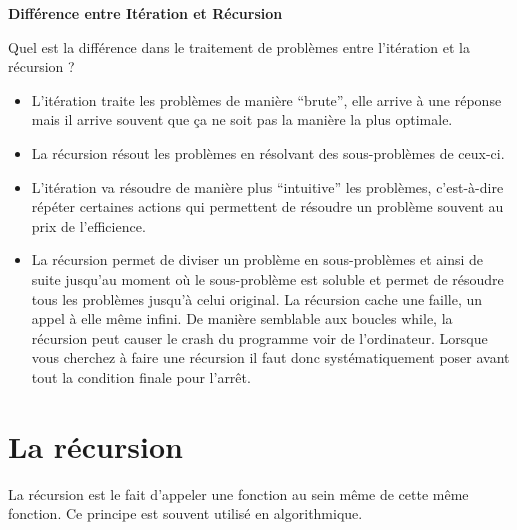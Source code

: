     \begin{Exercice}[5 minutes] \textbf{Différence entre Itération et Récursion}
      	
      	Quel est la différence dans le traitement de problèmes entre l'itération et la récursion ?
    
        \begin{conseil}
        
           \begin{itemize}
           	\item L'itération traite les problèmes de manière ``brute'', elle arrive à une réponse mais il arrive souvent que ça ne soit pas la manière la plus optimale.
           	\item La récursion résout les problèmes en résolvant des sous-problèmes de ceux-ci.
           \end{itemize}
		     
        \end{conseil}
        
        \begin{solution}
        	\begin{itemize}
            \item L'itération va résoudre de manière plus ``intuitive'' les problèmes, c'est-à-dire répéter certaines actions qui permettent de résoudre un problème souvent au prix de l'efficience.
            \item La récursion permet de diviser un problème en sous-problèmes et ainsi de suite jusqu'au moment où le sous-problème est soluble et permet de résoudre tous les problèmes jusqu'à celui original. La récursion cache une faille, un appel à elle même infini. De manière semblable aux boucles while, la récursion peut causer le crash du programme voir de l'ordinateur. Lorsque vous cherchez à faire une récursion il faut donc systématiquement poser avant tout la condition finale pour l'arrêt.
           \end{itemize}
        \end{solution}
    \end{Exercice}
    
    
    \section{La récursion}
    
    La récursion est le fait d'appeler une fonction au sein même de cette même fonction. Ce principe est souvent utilisé en algorithmique. \\
    
